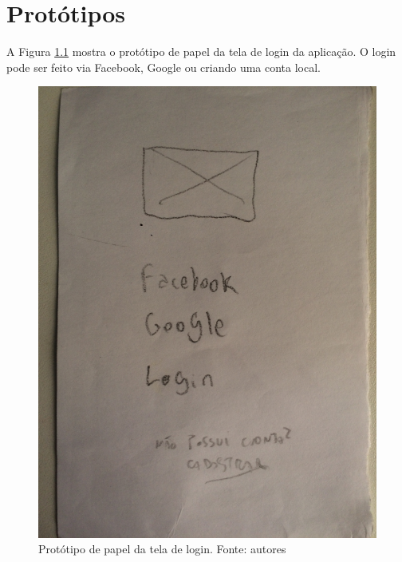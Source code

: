 \chapter{Protótipos}
\label{chap:prototipo}

A Figura \ref{img:prototipo_de_papel_tela_de_login} mostra o protótipo de papel da tela de login da aplicação. O login pode ser feito via Facebook, Google ou criando uma conta local.
\begin{figure}[H]
    \centering
    \includegraphics[scale=0.1, angle=-90]{figuras/prototipo_papel_login.jpg}
    \caption[Protótipo de papel da tela de login]{Protótipo de papel da tela de login. Fonte: autores}
    \label{img:prototipo_de_papel_tela_de_login}
\end{figure}
 \pagebreak


